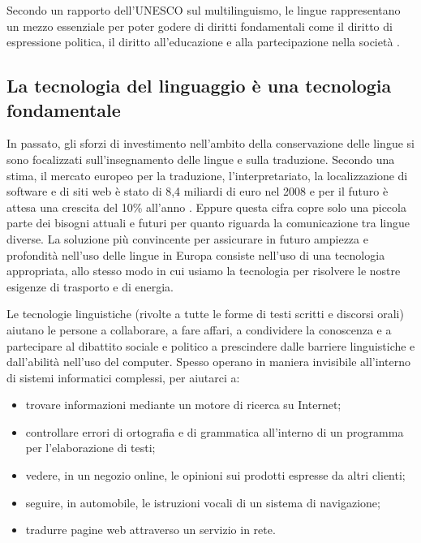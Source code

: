 \begin{multicols}{2}
Secondo un rapporto dell'UNESCO sul multilinguismo, le lingue
rappresentano un mezzo essenziale per poter godere di diritti fondamentali
come il diritto di espressione politica, il diritto all'educazione e alla
partecipazione nella societ\`{a} \cite{Unesco1}.


\subsection{La tecnologia del linguaggio \`{e} una tecnologia fondamentale}

In passato, gli sforzi di investimento nell'ambito della conservazione delle
lingue si sono focalizzati sull'insegnamento delle lingue e sulla
traduzione. Secondo una stima, il mercato europeo per la traduzione,
l'interpretariato, la localizzazione di software e di siti web \`{e} stato di
8,4 miliardi di euro nel 2008 e per il futuro \`{e} attesa una crescita del
10\% all'anno \cite{EC3}. Eppure questa cifra copre solo una piccola parte dei
bisogni attuali e futuri per quanto riguarda la comunicazione tra lingue
diverse. La soluzione pi\`{u} convincente per assicurare in futuro ampiezza e
profondit\`{a} nell'uso delle lingue in Europa consiste nell'uso di una
tecnologia appropriata, allo stesso modo in cui usiamo la tecnologia per
risolvere le nostre esigenze di trasporto e di energia.

Le tecnologie linguistiche (rivolte a tutte le forme di testi scritti e
discorsi orali) aiutano le persone a collaborare, a fare affari, a condividere
la conoscenza e a partecipare al dibattito sociale e politico a prescindere
dalle barriere linguistiche e dall'abilit\`{a} nell'uso del computer. Spesso
operano in maniera invisibile all'interno di sistemi informatici complessi,
per aiutarci a:

\begin{itemize}
\item trovare informazioni mediante un motore di ricerca su Internet;
\item controllare errori di ortografia e di grammatica all'interno di un programma per l'elaborazione di testi;
\item vedere, in un negozio online, le opinioni sui prodotti espresse da altri
  clienti;
\item seguire, in automobile, le istruzioni vocali di un sistema di navigazione;
\item tradurre pagine web attraverso un servizio in rete. 
\end{itemize}


\end{multicols}
